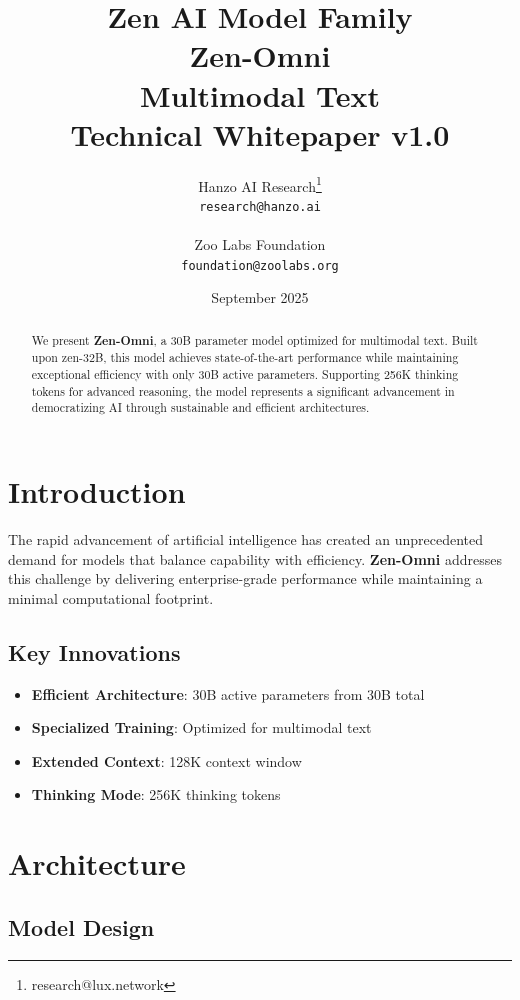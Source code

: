 \documentclass[11pt,a4paper]{article}
\title{
    \vspace{-2cm}
    \Large \textbf{Zen AI Model Family} \\
    \vspace{0.5cm}
    \Huge \textbf{Zen-Omni} \\
    \vspace{0.3cm}
    \large Multimodal Text \\
    \vspace{0.5cm}
    \normalsize Technical Whitepaper v1.0
}
\author{
    Hanzo AI Research\thanks{research@lux.network} \\
    \texttt{research@hanzo.ai} \\
    \\
    Zoo Labs Foundation \\
    \texttt{foundation@zoolabs.org}
}
\date{September 2025}
\begin{document}
\maketitle

\begin{abstract}
We present \textbf{Zen-Omni}, a 30B parameter model optimized for multimodal text. 
Built upon zen-32B, this model achieves state-of-the-art performance while maintaining exceptional efficiency 
with only 30B active parameters. Supporting 256K thinking tokens for advanced reasoning, the model represents a significant advancement in democratizing AI through sustainable and efficient architectures.
\end{abstract}

\tableofcontents
\newpage

\section{Introduction}

The rapid advancement of artificial intelligence has created an unprecedented demand for models that balance capability with efficiency. 
\textbf{Zen-Omni} addresses this challenge by delivering enterprise-grade performance while maintaining a minimal computational footprint.

\subsection{Key Innovations}
\begin{itemize}
    \item \textbf{Efficient Architecture}: 30B active parameters from 30B total
    \item \textbf{Specialized Training}: Optimized for multimodal text
    \item \textbf{Extended Context}: 128K context window
    \item \textbf{Thinking Mode}: 256K thinking tokens
\end{itemize}
    
    

\section{Architecture}

\subsection{Model Design}
\end{document}
